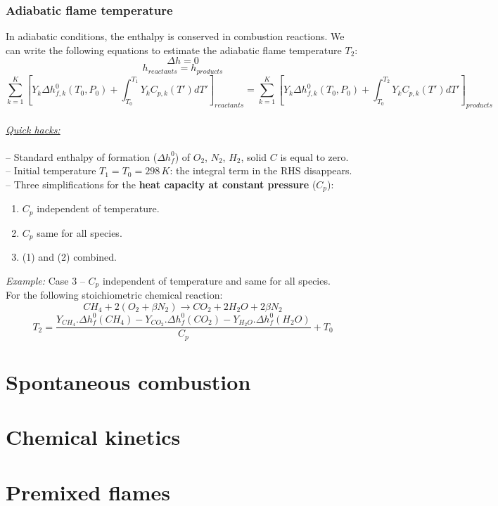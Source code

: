 \documentclass[a4paper,11pt]{article}
\begin{document}
\subsubsection{Adiabatic flame temperature}
In adiabatic conditions, the enthalpy is conserved in combustion reactions. We can write the following equations to estimate the adiabatic flame temperature $T_2$:
\[\Delta h = 0\]
\[h_{reactants} = h_{products}\]
\[\sum^{K}_{k=1}[Y_k\Delta h^0_{f,k}(T_0,P_0)+\int_{T_0}^{T_1}Y_kC_{p,k}(T')dT']_{reactants} = \sum^{K}_{k=1}[Y_k\Delta h^0_{f,k}(T_0,P_0)+\int_{T_0}^{T_2}Y_kC_{p,k}(T')dT']_{products}\]\\
\noindent
\emph{\underline{Quick hacks:}}\\ \\
-- Standard enthalpy of formation ($\Delta h_f^0$) of $O_2$, $N_2$, $H_2$, solid $C$ is equal to zero.\\
-- Initial temperature $T_1=T_0=298\,K$: the integral term in the RHS disappears.
\\
-- Three simplifications for the \textbf{heat capacity at constant pressure} ($C_p$):
\begin{enumerate}
    \item $C_p$ independent of temperature.
    \item $C_p$ same for all species.
    \item (1) and (2) combined.
\end{enumerate}
\emph{Example:} Case 3 -- $C_p$ independent of temperature and same for all species.\\
For the following stoichiometric chemical reaction:
\[CH_4+2(O_2+\beta N_2) \rightarrow CO_2 + 2 H_2O +2\beta N_2\]
\[T_2 = \frac{Y_{CH_4}.\Delta h_f^0(CH_4)
- Y_{CO_2}.\Delta h_f^0(CO_2)
- Y_{H_2O}.\Delta h_f^0(H_2O)}
{C_p}+T_0
\]









\pagebreak
\section{Spontaneous combustion}
\pagebreak
\section{Chemical kinetics}
\pagebreak
\section{Premixed flames}
\pagebreak
\end{document}
